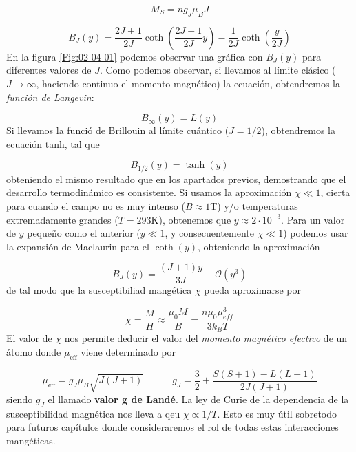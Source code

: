 \documentclass[12pt,a4paper]{book}
\numberwithin{equation}{section}
\numberwithin{figure}{section}
\newcommand{\tquad}{\quad \quad \quad}
\newcommand{\parentesis}[1]{\left( #1  \right)}
\newcommand{\eff}{\mathrm{eff}}
\begin{document}
\begin{equation}
    M_S = n g_J \mu_B J
\end{equation}

\begin{equation}
    B_J (y) = \frac{2J+1}{2J} \coth \parentesis{\frac{2J +1}{2J} y} - \frac{1}{2J} \coth \parentesis{\frac{y}{2J}}
\end{equation}
En la figura \ref{Fig:02-04-01} podemos observar una gráfica con $B_J(y)$ para diferentes valores de $J$. Como podemos observar, si llevamos al límite clásico ($J\rightarrow \infty$, haciendo continuo el momento magnético) la ecuación,  obtendremos la \textit{función de Langevin}:

\begin{equation}
    B_{\infty} (y) = L(y)
\end{equation}
Si llevamos la funció de Brillouin al límite cuántico ($J=1/2$), obtendremos la ecuación tanh, tal que

\begin{equation}
    B_{1/2} (y) = \tanh(y)
\end{equation}
obteniendo el mismo resultado que en los apartados previos, demostrando que el desarrollo termodinámico es consistente. Si usamos la aproximación $\chi \ll 1$, cierta para cuando el campo no es muy intenso ($B \approx 1$T) y/o temperaturas extremadamente grandes ($T=293$K), obtenemos que $y\approx 2\cdot 10^{-3}$. Para un valor de $y$ pequeño como el anterior ($y \ll 1$, y consecuentemente $\chi \ll 1$) podemos usar la expansión de Maclaurin para el $\coth (y)$, obteniendo la aproximación

\begin{equation}
B_J (y) = \frac{(J+1)y}{3J} + \mathcal{O} (y^3)
\end{equation}
de tal modo que la susceptibiliad mangética $\chi$ pueda aproximarse por

\begin{equation}
\chi =\frac{M}{H} \approx \frac{\mu_0 M}{B} = \frac{n \mu_0 \mu_{eff}^3}{3 k_B T}
\end{equation}
El valor de $\chi$ nos permite deducir el valor del \textit{momento magnético efectivo} de un átomo donde $\mu_{\eff}$ viene determinado por

\begin{equation}
\mu_{\eff} = g_J \mu_B \sqrt{J (J+1)} \tquad g_J = \frac{3}{2} + \frac{S(S+1)-L(L+1)}{2J(J+1)}
\end{equation}
siendo $g_J$ el llamado \textbf{valor g de Landé}. La ley de Curie de la dependencia de la susceptibilidad magnética nos lleva a qeu $\chi \varpropto 1/T$. Esto es muy útil sobretodo para futuros capítulos donde consideraremos el rol de todas estas interacciones mangéticas.  \\
\end{document}
